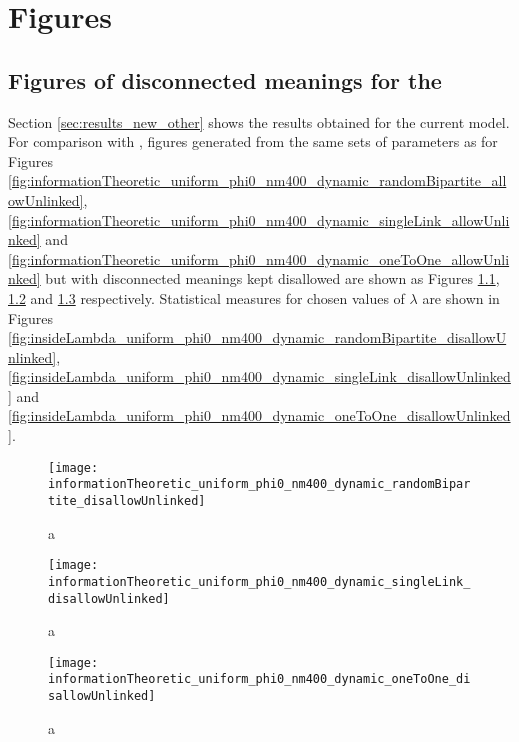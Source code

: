 \chapter{Figures}
\label{cha:app_figures}


\section{Figures of disconnected meanings for the \secondmodel{}}
\label{sec:app_figures_second-model}

Section \ref{sec:results_new_other} shows the results obtained for the current model.
For comparison with \cite{Ferrer2003a}, figures generated from the same sets of parameters as for Figures \ref{fig:informationTheoretic_uniform_phi0_nm400_dynamic_randomBipartite_allowUnlinked},  \ref{fig:informationTheoretic_uniform_phi0_nm400_dynamic_singleLink_allowUnlinked} and \ref{fig:informationTheoretic_uniform_phi0_nm400_dynamic_oneToOne_allowUnlinked} but with disconnected meanings kept disallowed are shown as Figures \ref{fig:informationTheoretic_uniform_phi0_nm400_dynamic_randomBipartite_disallowUnlinked},  \ref{fig:informationTheoretic_uniform_phi0_nm400_dynamic_singleLink_disallowUnlinked} and \ref{fig:informationTheoretic_uniform_phi0_nm400_dynamic_oneToOne_disallowUnlinked} respectively.
Statistical measures for chosen values of $\lambda$ are shown in Figures \ref{fig:insideLambda_uniform_phi0_nm400_dynamic_randomBipartite_disallowUnlinked}, \ref{fig:insideLambda_uniform_phi0_nm400_dynamic_singleLink_disallowUnlinked} and \ref{fig:insideLambda_uniform_phi0_nm400_dynamic_oneToOne_disallowUnlinked}.

\begin{figure}
  \centering
  \texttt{[image: informationTheoretic\_uniform\_phi0\_nm400\_dynamic\_randomBipartite\_disallowUnlinked]}
  \caption{a}
  \label{fig:informationTheoretic_uniform_phi0_nm400_dynamic_randomBipartite_disallowUnlinked}
\end{figure}

\begin{figure}
  \centering
  \texttt{[image: informationTheoretic\_uniform\_phi0\_nm400\_dynamic\_singleLink\_disallowUnlinked]}
  \caption{a}
  \label{fig:informationTheoretic_uniform_phi0_nm400_dynamic_singleLink_disallowUnlinked}
\end{figure}

\begin{figure}
  \centering
  \texttt{[image: informationTheoretic\_uniform\_phi0\_nm400\_dynamic\_oneToOne\_disallowUnlinked]}
  \caption{a}
  \label{fig:informationTheoretic_uniform_phi0_nm400_dynamic_oneToOne_disallowUnlinked}
\end{figure}

